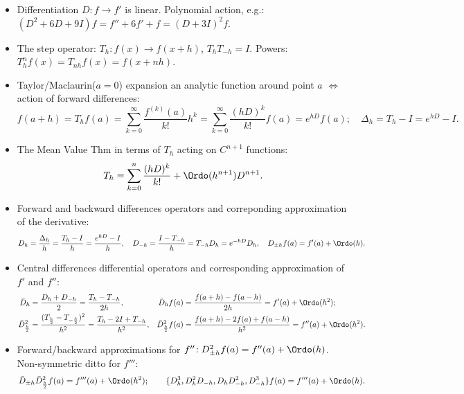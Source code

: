 \documentclass[a4paper]{article}
\begin{document}
\begin{itemize}

  \item Differentiation $D\!:\!f\to f'$ is linear.
  Polynomial action, e.g.: $(D^2+6D+9I)f=f''+6f'+f=(D+3I)^2f$.

  \item The step operator: $T_h\!:f(x)\to f(x+h)$,
    $T_hT_{-h}=I$. Powers: $T^n_hf(x)=T_{nh}f(x)=f(x+nh)$.

  \item Taylor/Maclaurin($a=0$) expansion an analytic function around  point $a$
    $\iff$
    action of forward differences:
    \[
      f(a+h)
      =T_hf(a)
      =\sum_{k=0}^\infty\frac{f^{(k)}(a)}{k!}h^k
      =\sum_{k=0}^\infty\frac{(hD)^k}{k!}f(a)
      = e^{hD}f(a); \quad
      \Delta_h=T_h-I=e^{hD}-I.
    \]

  \item The Mean Value Thm in terms of $T_h$ acting on $C^{n+1}$ functions:
    \[
     T_h = \sum_{k=0}^n\frac{(hD)^k}{k!}
      + \Ordo(h^{n+1})D^{n+1}.
    \]

  \item Forward and backward
    differences operators and correponding
    approximation of the derivative:
    \[
      D_h=\frac{\Delta_h}{h}=\frac{T_h-I}{h}=\frac{e^{hD}-I}{h},\quad
      D_{-h} =\frac{I-T_{-h}}{h} = T_{-h}D_h=e^{-hD}D_h,
      \quad
      D_{\pm h}f(a)=f'(a) + \Ordo(h).
    \]

  \item Central
    differences differential operators and corresponding
    approximation of $f'$ and $f''$:
    \begin{align*}
      \bar D_h
      &= \frac{D_h+D_{-h}}{2}
      = \frac{T_h-T_{-h}}{2h},
      &
      \bar D_hf(a)
      &= \frac{f(a+h)-f(a-h)}{2h}
      = f'(a) + \Ordo(h^2);
      \\
      \bar D_{\frac h2}^2
      &= \frac{(T_{\frac h2}-T_{-\frac h2})^2}{h^2}
       = \frac{T_{h}-2I+T_{-h}}{h^2},
      &
      \bar D_{\frac h2}^2f(a)
       &= \frac{f(a+h)-2f(a)+f(a-h)}{h^2}
        = f''(a) + \Ordo(h^2).
    \end{align*}

  \item Forward/backward approximations for
    $f''\!: D_{\pm h}^2f(a) = f''(a) + \Ordo(h)$.
    Non-symmetric ditto for $f'''$:
    \[
       \bar D_{\pm h}\bar D_{\frac h2}^2 f(a)
     = f'''(a) + \Ordo(h^2);
     \qquad
     \{
       D_h^3,
       D_h^2D_{-h},
       D_hD_{-h}^2,
       D_{-h}^3
     \}f(a)
     =
     f'''(a) + \Ordo(h).
    \]


\end{itemize}
\end{document}
